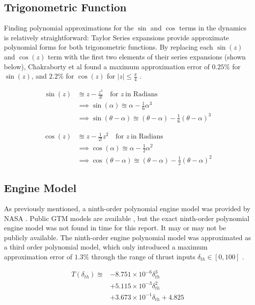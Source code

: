 \documentclass[%
 reprint,
 amsmath,amssymb,
 aps,
]{revtex4-2}
\begin{document}
\subsection{Trigonometric Function}

Finding polynomial approximations for the $\sin$ and $\cos$ terms in the dynamics is relatively straightforward: Taylor Series expansions provide approximate polynomial forms for both trigonometric functions. By replacing each $\sin(z)$ and $\cos(z)$ term with the first two elements of their series expansions (shown below), Chakraborty et al found a maximum approximation error of $0.25\%$ for $\sin(z)$, and $2.2\%$
for $\cos(z)$ for $|z| \leq \frac{\pi}{4}$ \cite{primary}.

\begin{align*}
    \sin{(z)} & \approxeq z - \frac{z^3}{3!}  \ \ \ \text{ for } z \ \text{in Radians} \\
    & \implies \sin{(\alpha)} \approxeq \alpha - \frac{1}{6}\alpha^3 \tag{13} \\
    & \implies \sin{(\theta - \alpha)} \approxeq (\theta - \alpha) - \frac{1}{6}(\theta - \alpha)^3 \tag{14}
\end{align*}

\begin{align*}
    \cos{(z)} & \approxeq z - \frac{1}{2!} z^2  \ \ \ \text{ for } z \ \text{in Radians} \\
    & \implies \cos{(\alpha)} \approxeq \alpha - \frac{1}{2}\alpha^2 \tag{15} \\
    & \implies \cos{(\theta - \alpha)} \approxeq (\theta - \alpha) - \frac{1}{2}(\theta - \alpha)^2 \tag{16}
\end{align*}

\subsection{Engine Model}

As previously mentioned, a ninth-order polynomial engine model was provided by NASA \cite{primary}. Public GTM models are available \cite{sosopt}\cite{github}, but the exact ninth-order polynomial engine model was not found in time for this report. It may or may not be publicly available. The ninth-order engine polynomial model was approximated as a third order polynomial model, which only introduced a maximum approximation error of $1.3\%$ through the range of thrust inputs $\delta_{th} \in \left[ 0, 100 \right]$ \cite{primary}.

\begin{align*}
    T(\delta_{th}) \approxeq
        &- 8.751 \times 10^{-6} \delta_{th}^3 \\
        &+ 5.115 \times 10^{-3} \delta_{th}^2 \\
        &+ 3.673 \times 10^{-1} \delta_{th} 
        + 4.825 \tag{17}
\end{align*}
\end{document}
